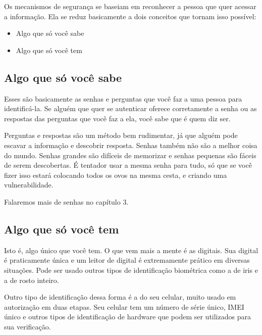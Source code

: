 Os mecanismos de segurança se baseiam em reconhecer a pessoa que quer acessar a informação. Ela se reduz basicamente a dois conceitos que tornam isso possível:

\begin{itemize}
    \item Algo que só você sabe
    \item Algo que só você tem
\end{itemize}

\subsection{Algo que só você sabe}

Esses são basicamente as senhas e perguntas que você faz a uma pessoa para identificá-la. Se alguém que quer se autenticar oferece corretamente a senha ou as respostas das perguntas que você faz a ela, você sabe que é quem diz ser.

Perguntas e respostas são um método bem rudimentar, já que alguém pode escavar a informação e descobrir resposta. Senhas também não são a melhor coisa do mundo. Senhas grandes são difíceis de memorizar e senhas pequenas são fáceis de serem descobertas. É tentador usar a mesma senha para tudo, só que se você fizer isso estará colocando todos os ovos na mesma cesta, e criando uma vulnerabilidade. 

Falaremos mais de senhas no capítulo 3.

\subsection{Algo que só você tem}

Isto é, algo único que você tem. O que vem mais a mente é as digitais. Sua digital é praticamente única e um leitor de digital é extremamente prático em diversas situações. Pode ser usado outros tipos de identificação biométrica como a de iris e a de rosto inteiro.

Outro tipo de identificação dessa forma é a do seu celular, muito usado em autorização em duas etapas. Seu celular tem um número de série único, IMEI único e outros tipos de identificação de hardware que podem ser utilizados para sua verificação.

